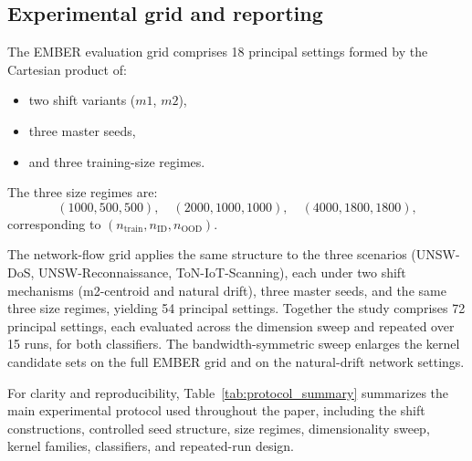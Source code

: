 \documentclass[journal]{IEEEtran}
\begin{document}
\subsection{Experimental grid and reporting}

The EMBER evaluation grid comprises 18 principal settings formed by the Cartesian product of:
\begin{itemize}
    \item two shift variants ($m1$, $m2$),
    \item three master seeds,
    \item and three training-size regimes.
\end{itemize}
The three size regimes are:
\[
(1000, 500, 500),\quad (2000, 1000, 1000),\quad (4000, 1800, 1800),
\]
corresponding to $(n_{\mathrm{train}}, n_{\mathrm{ID}}, n_{\mathrm{OOD}})$.

The network-flow grid applies the same structure to the three scenarios (UNSW-DoS, UNSW-Reconnaissance, ToN-IoT-Scanning), each under two shift mechanisms (m2-centroid and natural drift), three master seeds, and the same three size regimes, yielding 54 principal settings. Together the study comprises 72 principal settings, each evaluated across the dimension sweep and repeated over 15 runs, for both classifiers. The bandwidth-symmetric sweep enlarges the kernel candidate sets on the full EMBER grid and on the natural-drift network settings.

For clarity and reproducibility, Table~\ref{tab:protocol_summary} summarizes the main experimental protocol used throughout the paper, including the shift constructions, controlled seed structure, size regimes, dimensionality sweep, kernel families, classifiers, and repeated-run design.
\end{document}
